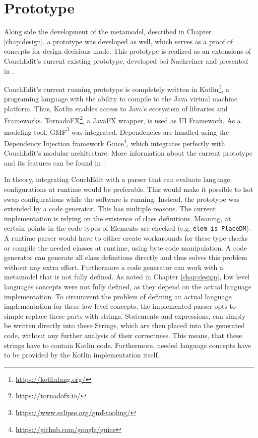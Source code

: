 \chapter{Prototype}
Along side the development of the metamodel, described in Chapter \ref{chap:design}, a prototype was developed as well, which serves as a proof of concepts for design decisions made. This prototype is realized as an extensions of CouchEdit's current existing prototype, developed bei Nachreiner and presented in \cite{nachreiner_couchedit_2020}.

CouchEdit's current running prototype is completely written in Kotlin\footnote{\url{https://kotlinlang.org/}}, a programing language with the ability to compile to the Java virtual machine platform. Thus, Kotlin enables access to Java's ecosystem of libraries and Frameworks. TornadoFX\footnote{\url{https://tornadofx.io/}}, a JavaFX wrapper, is used as UI Framework. As a modeling tool, GMF\footnote{\url{https://www.eclipse.org/gmf-tooling/}} was integrated. Dependencies are handled using the Dependency Injection framework Guice\footnote{\url{https://github.com/google/guice}}, which integrates perfectly with CouchEdit's modular architecture. More information about the current prototype and its features can be found in \cite{nachreiner_couchedit_2020}.

In theory, integrating CouchEdit with a parser that can evaluate language configurations at runtime would be preferable. This would make it possible to hot swap configurations while the software is running. Instead, the prototype was extended by a code generator. This has multiple reasons. The current implementation is relying on the existence of class definitions. Meaning, at certain points in the code types of Elements are checked (e.g. \texttt{elem is PlaceDM}). A runtime parser would have to either create workarounds for these type checks or compile the needed classes at runtime, using byte code manipulation. A code generator can generate all class definitions directly and thus solves this problem without any extra effort. Furthermore a code generator can work with a metamodel that is not fully defined. As noted in Chapter \ref{chap:design}, low level languages concepts were not fully defined, as they depend on the actual language implementation. To circumvent the problem of defining an actual language implementation for these low level concepts, the implemented parser opts to simple replace these parts with strings. Statements and expressions, can simply be written directly into these Strings, which are then placed into the generated code, without any further analysis of their correctness. This means, that these strings have to contain Kotlin code. Furthermore, needed language concepts have to be provided by the Kotlin implementation itself.

